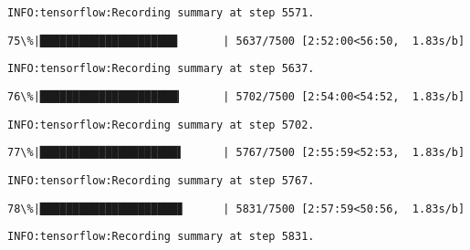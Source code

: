 \documentclass[11pt]{article}
\begin{document}
    \begin{Verbatim}[commandchars=\\\{\}]
INFO:tensorflow:Recording summary at step 5571.

    \end{Verbatim}

    \begin{Verbatim}[commandchars=\\\{\}]
 75\%|█████████████████████       | 5637/7500 [2:52:00<56:50,  1.83s/b]
    \end{Verbatim}

    \begin{Verbatim}[commandchars=\\\{\}]
INFO:tensorflow:Recording summary at step 5637.

    \end{Verbatim}

    \begin{Verbatim}[commandchars=\\\{\}]
 76\%|█████████████████████▎      | 5702/7500 [2:54:00<54:52,  1.83s/b]
    \end{Verbatim}

    \begin{Verbatim}[commandchars=\\\{\}]
INFO:tensorflow:Recording summary at step 5702.

    \end{Verbatim}

    \begin{Verbatim}[commandchars=\\\{\}]
 77\%|█████████████████████▌      | 5767/7500 [2:55:59<52:53,  1.83s/b]
    \end{Verbatim}

    \begin{Verbatim}[commandchars=\\\{\}]
INFO:tensorflow:Recording summary at step 5767.

    \end{Verbatim}

    \begin{Verbatim}[commandchars=\\\{\}]
 78\%|█████████████████████▊      | 5831/7500 [2:57:59<50:56,  1.83s/b]
    \end{Verbatim}

    \begin{Verbatim}[commandchars=\\\{\}]
INFO:tensorflow:Recording summary at step 5831.

    \end{Verbatim}
\end{document}
